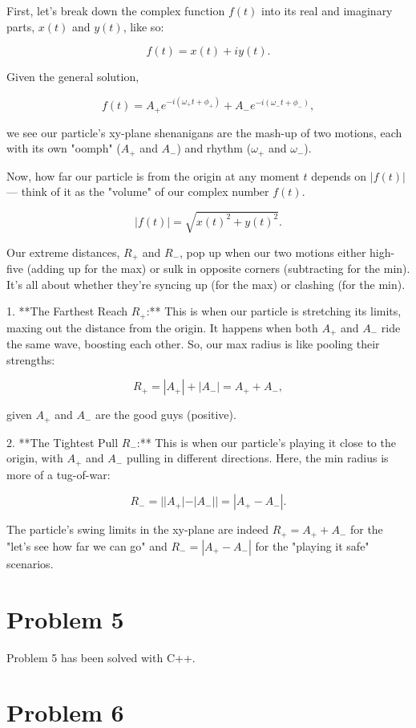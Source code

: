 \documentclass{article}
\begin{document}
First, let's break down the complex function \(f(t)\) into its real and imaginary parts, \(x(t)\) and \(y(t)\), like so:

\[
f(t) = x(t) + iy(t).
\]

Given the general solution,

\[
f(t) = A_+ e^{-i(\omega_+ t + \phi_+)} + A_- e^{-i(\omega_- t + \phi_-)},
\]

we see our particle's xy-plane shenanigans are the mash-up of two motions, each with its own "oomph" (\(A_+\) and \(A_-\)) and rhythm (\(\omega_+\) and \(\omega_-\)).

Now, how far our particle is from the origin at any moment \(t\) depends on \(|f(t)|\) — think of it as the "volume" of our complex number \(f(t)\).

\[
|f(t)| = \sqrt{x(t)^2 + y(t)^2}.
\]

Our extreme distances, \(R_+\) and \(R_-\), pop up when our two motions either high-five (adding up for the max) or sulk in opposite corners (subtracting for the min). It's all about whether they're syncing up (for the max) or clashing (for the min).

1. **The Farthest Reach \(R_+\):** This is when our particle is stretching its limits, maxing out the distance from the origin. It happens when both \(A_+\) and \(A_-\) ride the same wave, boosting each other. So, our max radius is like pooling their strengths:

\[
R_+ = |A_+| + |A_-| = A_+ + A_-,
\]

given \(A_+\) and \(A_-\) are the good guys (positive).

2. **The Tightest Pull \(R_-\):** This is when our particle's playing it close to the origin, with \(A_+\) and \(A_-\) pulling in different directions. Here, the min radius is more of a tug-of-war:

\[
R_- = ||A_+| - |A_-|| = |A_+ - A_-|.
\]

The particle's swing limits in the xy-plane are indeed \(R_+ = A_+ + A_-\) for the "let's see how far we can go" and \(R_- = |A_+ - A_-|\) for the "playing it safe" scenarios.


\section{Problem 5}


{Problem 5} has been solved with C++.

\section{Problem 6}
\end{document}

